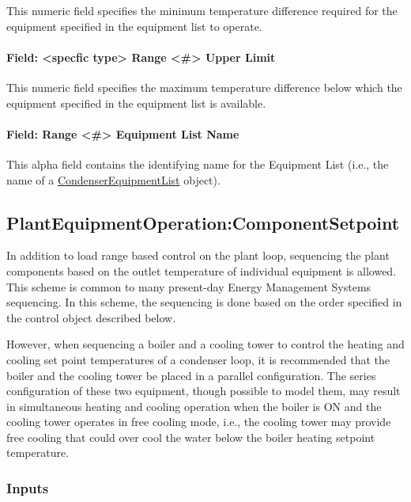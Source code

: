 This numeric field specifies the minimum temperature difference required for the equipment specified in the equipment list to operate.

\paragraph{Field: \textless{}specfic type\textgreater{} Range \textless{}\#\textgreater{} Upper Limit}\label{field-specfic-type-range-upper-limit}

This numeric field specifies the maximum temperature difference below which the equipment specified in the equipment list is available.

\paragraph{Field: Range \textless{}\#\textgreater{} Equipment List Name}\label{field-range-equipment-list-name-2}

This alpha field contains the identifying name for the Equipment List (i.e., the name of a \hyperref[condenserequipmentlist]{CondenserEquipmentList} object).

\subsection{PlantEquipmentOperation:ComponentSetpoint}\label{plantequipmentoperationcomponentsetpoint}

In addition to load range based control on the plant loop, sequencing the plant components based on the outlet temperature of individual equipment is allowed. This scheme is common to many present-day Energy Management Systems sequencing. In this scheme, the sequencing is done based on the order specified in the control object described below.

However, when sequencing a boiler and a cooling tower to control the heating and cooling set point temperatures of a condenser loop, it is recommended that the boiler and the cooling tower be placed in a parallel configuration. The series configuration of these two equipment, though possible to model them, may result in simultaneous heating and cooling operation when the boiler is ON and the cooling tower operates in free cooling mode, i.e., 
the cooling tower may provide free cooling that could over cool the water below the boiler heating setpoint temperature.  


\subsubsection{Inputs}\label{inputs-12-011}

